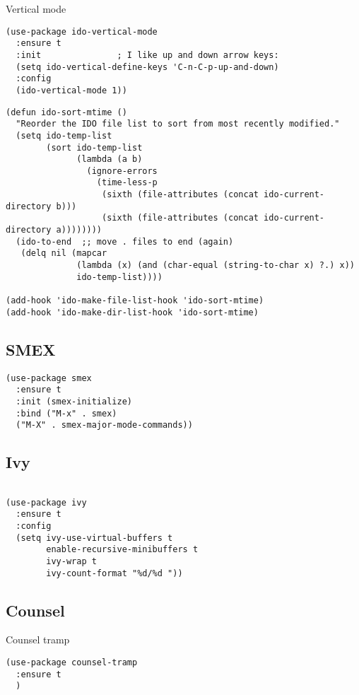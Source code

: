 \documentclass[12pt]{article}
\begin{document}
Vertical mode 
\begin{verbatim}
(use-package ido-vertical-mode
  :ensure t
  :init               ; I like up and down arrow keys:
  (setq ido-vertical-define-keys 'C-n-C-p-up-and-down)
  :config
  (ido-vertical-mode 1))

\end{verbatim}

\begin{verbatim}
(defun ido-sort-mtime ()
  "Reorder the IDO file list to sort from most recently modified."
  (setq ido-temp-list
        (sort ido-temp-list
              (lambda (a b)
                (ignore-errors
                  (time-less-p
                   (sixth (file-attributes (concat ido-current-directory b)))
                   (sixth (file-attributes (concat ido-current-directory a))))))))
  (ido-to-end  ;; move . files to end (again)
   (delq nil (mapcar
              (lambda (x) (and (char-equal (string-to-char x) ?.) x))
              ido-temp-list))))

(add-hook 'ido-make-file-list-hook 'ido-sort-mtime)
(add-hook 'ido-make-dir-list-hook 'ido-sort-mtime)

\end{verbatim}

\subsection{SMEX}
\label{sec:org684248b}
\begin{verbatim}
(use-package smex
  :ensure t
  :init (smex-initialize)
  :bind ("M-x" . smex)
  ("M-X" . smex-major-mode-commands))

\end{verbatim}
\subsection{Ivy}
\label{sec:org8242f75}
\begin{verbatim}

(use-package ivy
  :ensure t
  :config
  (setq ivy-use-virtual-buffers t
        enable-recursive-minibuffers t
        ivy-wrap t 
        ivy-count-format "%d/%d "))
\end{verbatim}


\subsection{Counsel}
\label{sec:orgd29dc36}
Counsel tramp 
\begin{verbatim}
(use-package counsel-tramp
  :ensure t
  )
\end{verbatim}
\end{document}
